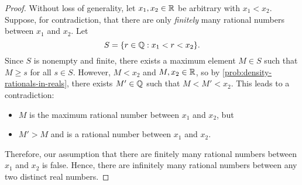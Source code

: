 \begin{proof}
  Without loss of generality, let $x_{1}, x_{2} \in \mathbb{R}$ be arbitrary with $x_{1} < x_{2}$. Suppose, for 
  contradiction, that there are only \textit{finitely} many rational numbers between $x_{1}$ and $x_{2}$. Let
  \[
    S = \{r \in \mathbb{Q} : x_{1} < r < x_{2} \}.
  \]
  Since $S$ is nonempty and finite, there exists a maximum element $M \in S$
  such that $M \geq s$ for all $s \in S$. However, $M < x_{2}$ and $M, x_{2} \in \mathbb{R}$, 
  so by \ref{prob:density-rationals-in-reals}, there exists $M' \in \mathbb{Q}$ 
  such that $M < M' < x_{2}$. This leads to a contradiction:
  \begin{itemize}
    \item $M$ is the maximum rational number between $x_{1}$ and $x_{2}$, but
    \item $M' > M$ and is a rational number between $x_{1}$ and $x_{2}$.
  \end{itemize}
  Therefore, our assumption that there are finitely many rational numbers
  between $x_{1}$ and $x_{2}$ is false. Hence, there are infinitely many rational
  numbers between any two distinct real numbers.
\end{proof}
